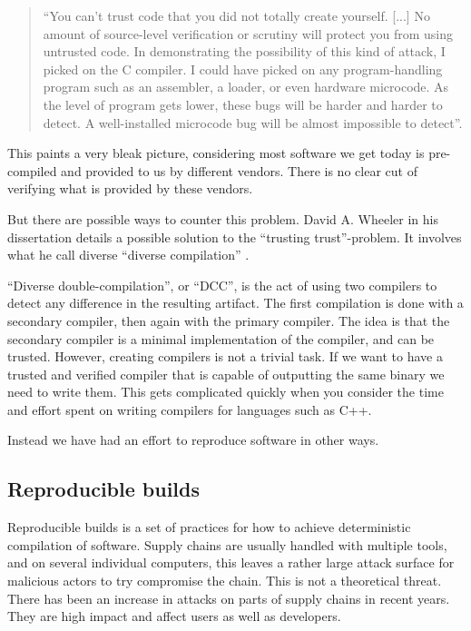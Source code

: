 \documentclass[../Main/thesis.tex]{subfiles}
\begin{document}
\begin{quotation}
``You can't trust code that you did not totally create yourself. [...] No amount
of source-level verification or scrutiny will protect you from using untrusted
code. In demonstrating the possibility of this kind of attack, I picked on the C
compiler. I could have picked on any program-handling program such as an
assembler, a loader, or even hardware microcode. As the level of program gets
lower, these bugs will be harder and harder to detect.  A well-installed
microcode bug will be almost impossible to
detect''\cite{Thompson:1984:RTT:358198.358210}.
\end{quotation}

This paints a very bleak picture, considering most software we get today is
pre-compiled and provided to us by different vendors. There is no clear cut of
verifying what is provided by these vendors.

But there are possible ways to counter this problem.  David A. Wheeler in his
dissertation  details a possible solution to
the ``trusting trust''-problem. It involves what he call diverse ``diverse
compilation'' \cite{Wheeler:2005:CTT:1106778.1106809}.

``Diverse double-compilation'', or ``DCC'', is the act of using two compilers to
detect any difference in the resulting artifact. The first compilation is done
with a secondary compiler, then again with the primary compiler. The idea is
that the secondary compiler is a minimal implementation of the compiler, and can
be trusted. However, creating compilers is not a trivial task. If we want to
have a trusted and verified compiler that is capable of outputting the same
binary we need to write them. This gets complicated quickly when you consider
the time and effort spent on writing compilers for languages such as C++.

Instead we have had an effort to reproduce software in other ways.


\subsection*{Reproducible builds}
Reproducible builds is a set of practices for how to achieve deterministic
compilation of software. Supply chains are usually handled with multiple tools,
and on several individual computers, this leaves a rather large attack surface
for malicious actors to try compromise the chain. This is not a theoretical
threat. There has been an increase in attacks on parts of supply chains in
recent years. They are high impact and affect users as well as developers.
\end{document}
